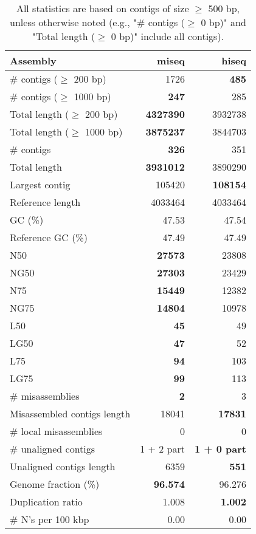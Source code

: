 \documentclass[12pt,a4paper]{article}
\begin{document}
\begin{table}[ht]
\begin{center}
\caption{All statistics are based on contigs of size $\geq$ 500 bp, unless otherwise noted (e.g., "\# contigs ($\geq$ 0 bp)" and "Total length ($\geq$ 0 bp)" include all contigs).}
\begin{tabular}{|l*{2}{|r}|}
\hline
Assembly & miseq & hiseq \\ \hline
\# contigs ($\geq$ 200 bp) & 1726 & {\bf 485} \\ \hline
\# contigs ($\geq$ 1000 bp) & {\bf 247} & 285 \\ \hline
Total length ($\geq$ 200 bp) & {\bf 4327390} & 3932738 \\ \hline
Total length ($\geq$ 1000 bp) & {\bf 3875237} & 3844703 \\ \hline
\# contigs & {\bf 326} & 351 \\ \hline
Total length & {\bf 3931012} & 3890290 \\ \hline
Largest contig & 105420 & {\bf 108154} \\ \hline
Reference length & 4033464 & 4033464 \\ \hline
GC (\%) & 47.53 & 47.54 \\ \hline
Reference GC (\%) & 47.49 & 47.49 \\ \hline
N50 & {\bf 27573} & 23808 \\ \hline
NG50 & {\bf 27303} & 23429 \\ \hline
N75 & {\bf 15449} & 12382 \\ \hline
NG75 & {\bf 14804} & 10978 \\ \hline
L50 & {\bf 45} & 49 \\ \hline
LG50 & {\bf 47} & 52 \\ \hline
L75 & {\bf 94} & 103 \\ \hline
LG75 & {\bf 99} & 113 \\ \hline
\# misassemblies & {\bf 2} & 3 \\ \hline
Misassembled contigs length & 18041 & {\bf 17831} \\ \hline
\# local misassemblies & 0 & 0 \\ \hline
\# unaligned contigs & 1 + 2 part & {\bf 1 + 0 part} \\ \hline
Unaligned contigs length & 6359 & {\bf 551} \\ \hline
Genome fraction (\%) & {\bf 96.574} & 96.276 \\ \hline
Duplication ratio & 1.008 & {\bf 1.002} \\ \hline
\# N's per 100 kbp & 0.00 & 0.00 \\ \hline

\end{tabular}
\end{center}
\end{table}
\end{document}
